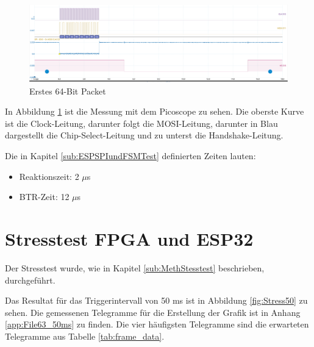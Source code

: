 \begin{figure}
    \centering
    \includegraphics[width=\linewidth]{Figures/Chap4/Verbindungstest_SPI/VerbindungstestZeiten.png}
    \caption{Erstes 64-Bit Packet}
    \label{fig:VerbindungstestZeiten}
\end{figure}

In Abbildung \ref{fig:VerbindungstestZeiten} ist die Messung mit dem Picoscope zu sehen. Die oberste Kurve ist die Clock-Leitung, darunter folgt die MOSI-Leitung, darunter in Blau dargestellt die Chip-Select-Leitung und zu unterst die Handshake-Leitung.

Die in Kapitel \ref{sub:ESPSPIundFSMTest} definierten Zeiten lauten:
\begin{itemize}
    \item Reaktionszeit: 2 $\mu$s
    \item BTR-Zeit: 12 $\mu$s
\end{itemize}


\section{Stresstest FPGA und ESP32}
\label{sec:ResStresstest}

Der Stresstest wurde, wie in Kapitel \ref{sub:MethStesstest} beschrieben, durchgeführt.

Das Resultat für das Triggerintervall von 50 ms ist in Abbildung \ref{fig:Stress50} zu sehen. Die gemessenen Telegramme für die Erstellung der Grafik ist in Anhang \ref{app:File63_50ms} zu finden. Die vier häufigsten Telegramme sind die erwarteten Telegramme aus Tabelle \ref{tab:frame_data}.


